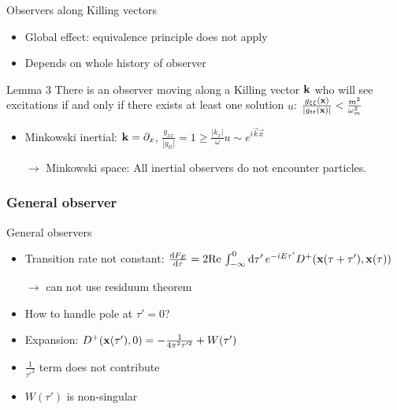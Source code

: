 \documentclass{beamer}
\renewcommand{\va}[1]{\vec{#1}}
\begin{document}
\begin{frame}{Observers along Killing vectors}
\begin{itemize}
	\item Global effect: equivalence principle does not apply
	\item Depends on whole history of observer 
	\item[]
\end{itemize}
\begin{block}{Lemma 3}
There is an observer moving along a Killing vector \(\vb{k}\) who will see excitations if and only if there exists at least one solution \(u\): \(\frac{g_{\xi\xi}(\vb{x})}{|g_{tt}(\vb{x})|} < \frac{m^2}{\omega_m^2}\)
\end{block} 
\begin{itemize}
	\item Minkowski inertial: \(\vb{k} = \partial_x\), \(\frac{g_{xx}}{|g_{tt}|} = 1 \geq \frac{|k_x|}{\omega}\)\hspace{2cm}\(u \sim e^{i \va{k} \va{x}}\) 
	\item[\(\to\)] Minkowski space: All inertial observers do not encounter particles.
\end{itemize}
\end{frame}


\subsubsection{General observer}
\begin{frame}{General observers}
\begin{itemize}
	\item Transition rate not constant: \(\dv{F_E}{\tau} = 2 \mathrm{Re}\,\int_{-\infty}^0 \dd{\tau'} e^{-i E \tau'} D^+(\vb{x}(\tau + \tau'), \vb{x}(\tau))\)
	\item[]\(\to\) can not use residuum theorem
	\item How to handle pole at \(\tau' = 0\)?
	\item[]
	\item Expansion: \(D^+(\vb{x}(\tau'), 0) = - \frac{1}{4\pi^2\tau'^2} + W(\tau')\)
	\item \(\frac{1}{\tau'^2}\) term does not contribute
	\item \(W(\tau')\) is non-singular
\end{itemize}
\end{frame}

\frame{\setcounter{tocdepth}{1}\hspace{1cm}\tableofcontents}
\end{document}
